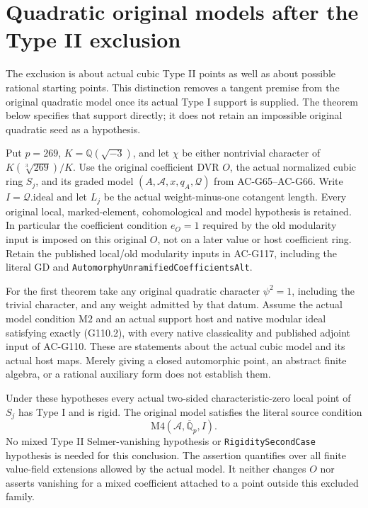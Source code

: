\section{Quadratic original models after the Type II exclusion}
\label{sec:cubic-quadratic-model-rigidity}

The exclusion is about actual cubic Type II points as well as about
possible rational starting points.  This distinction removes a tangent
premise from the original quadratic model once its actual Type I
support is supplied.  The theorem below specifies that support directly;
it does not retain an impossible original quadratic seed as a hypothesis.

Put $p=269$, $K=\mathbb Q(\sqrt{-3})$, and let $\chi$ be either
nontrivial character of $K(\sqrt[3]{269})/K$.  Use the original
coefficient DVR $O$, the actual normalized cubic ring $S_j$, and its
graded model $(A,\mathcal A,x,q_A,\mathcal Q)$ from AC-G65--AC-G66.
Write $I=\mathcal Q.\mathrm{ideal}$ and let $L_j$ be the actual
weight-minus-one cotangent length.  Every original local, marked-element,
cohomological and model hypothesis is retained.  In particular the
coefficient condition $e_O=1$ required by the old modularity input is
imposed on this original $O$, not on a later value or host coefficient
ring.  Retain the published local/old modularity inputs in AC-G117,
including the literal $\mathrm{GD}$ and
\texttt{AutomorphyUnramifiedCoefficientsAlt}.

For the first theorem take any original quadratic character
$\psi^2=1$, including the trivial character, and any weight admitted
by that datum.  Assume the actual model condition $\mathrm{M2}$ and
an actual support host and native modular ideal satisfying exactly
(G110.2), with every native classicality and published adjoint input of
AC-G110.  These are statements about the actual cubic model and its
actual host maps.  Merely giving a closed automorphic point, an abstract
finite algebra, or a rational auxiliary form does not establish them.

\begin{theorem}
\label{AC-G122-M4}
Under these hypotheses every actual two-sided characteristic-zero
local point of $S_j$ has Type I and is rigid.  The original model
satisfies the literal source condition
\[
                \mathrm{M4}(\mathcal A,\overline{\mathbb Q}_p,I).
                                                        \tag{G122.1}
\]
No mixed Type II Selmer-vanishing hypothesis or
\texttt{RigiditySecondCase} hypothesis is needed for this conclusion.
The assertion quantifies over all finite value-field extensions allowed
by the actual model.  It neither changes $O$ nor asserts vanishing for
a mixed coefficient attached to a point outside this excluded family.
\end{theorem}

